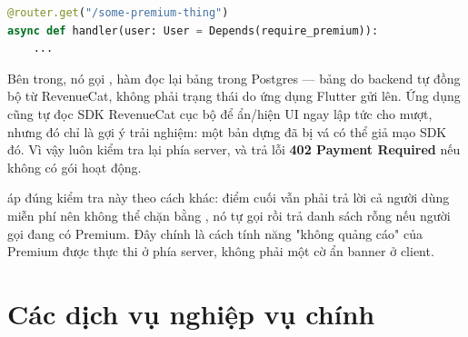 \begin{lstlisting}[language=Python]
@router.get("/some-premium-thing")
async def handler(user: User = Depends(require_premium)):
    ...
\end{lstlisting}

Bên trong, nó gọi , hàm đọc lại bảng
 trong Postgres — bảng do backend tự đồng bộ từ RevenueCat, không
phải trạng thái do ứng dụng Flutter gửi lên. Ứng dụng cũng tự đọc SDK RevenueCat cục bộ để
ẩn/hiện UI ngay lập tức cho mượt, nhưng đó chỉ là gợi ý trải nghiệm: một bản dựng đã bị vá
có thể giả mạo SDK đó. Vì vậy  luôn kiểm tra lại phía server, và trả
lỗi \textbf{402 Payment Required} nếu không có gói hoạt động.

 áp đúng kiểm tra này theo cách khác: điểm cuối vẫn phải
trả lời cả người dùng miễn phí nên không thể chặn bằng , nó tự gọi
 rồi trả danh sách rỗng nếu người gọi đang có Premium.
Đây chính là cách tính năng "không quảng cáo" của Premium được thực thi ở phía server,
không phải một cờ ẩn banner ở client.

\section{Các dịch vụ nghiệp vụ chính}

